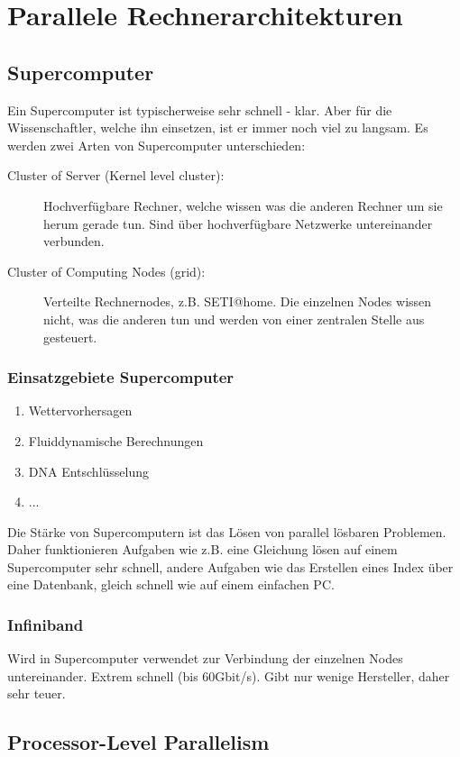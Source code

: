 \chapter{Parallele Rechnerarchitekturen}

\section{Supercomputer}
Ein Supercomputer ist typischerweise sehr schnell - klar. Aber für die Wissenschaftler, welche ihn einsetzen, ist er immer noch viel zu langsam. Es werden zwei Arten von Supercomputer unterschieden:

\begin{description}
	\item[Cluster of Server (Kernel level cluster): ] Hochverfügbare Rechner, welche wissen was die anderen Rechner um sie herum gerade tun. Sind über hochverfügbare Netzwerke untereinander verbunden.
	\item[Cluster of Computing Nodes (grid):] Verteilte Rechnernodes, z.B. SETI@home. Die einzelnen Nodes wissen nicht, was die anderen tun und werden von einer zentralen Stelle aus gesteuert.
\end{description}

\subsection{Einsatzgebiete Supercomputer}
\begin{enumerate}
	\item Wettervorhersagen
	\item Fluiddynamische Berechnungen
	\item DNA Entschlüsselung
	\item ...
\end{enumerate}
Die Stärke von Supercomputern ist das Lösen von parallel lösbaren Problemen. Daher funktionieren Aufgaben wie z.B. eine Gleichung lösen auf einem Supercomputer sehr schnell, andere Aufgaben wie das Erstellen eines Index über eine Datenbank, gleich schnell wie auf einem einfachen PC.

\subsection{Infiniband}
Wird in Supercomputer verwendet zur Verbindung der einzelnen Nodes untereinander. Extrem schnell (bis 60Gbit/s). Gibt nur wenige Hersteller, daher sehr teuer.

\section{Processor-Level Parallelism}

